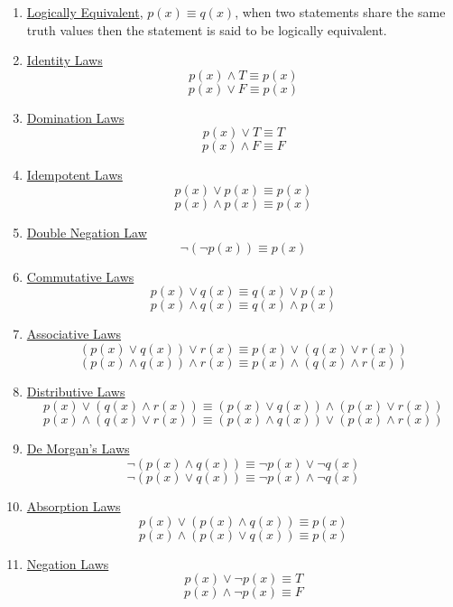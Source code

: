 \documentclass[12pt]{article}
\begin{document}
\begin{enumerate}
\item \underline{Logically Equivalent}, $p(x) \equiv q(x)$, when two statements share the same truth values then the statement is said to be logically equivalent.
\item \underline{Identity Laws} 
\[
	p(x) \wedge T \equiv p(x)
\]
\[
	p(x) \lor F \equiv p(x)
\]

\item \underline{Domination Laws}
\[
	p(x) \lor T \equiv T 
\]
\[
	p(x) \wedge F \equiv F
\]

\item \underline{Idempotent Laws}
\[
	p(x) \lor p(x) \equiv p(x)
\]
\[
	p(x) \wedge p(x) \equiv p(x)
\]

\item \underline{Double Negation Law}
\[
	\neg (\neg p(x)) \equiv p(x)
\]

\item \underline{Commutative Laws}
\[
	p(x) \lor q(x) \equiv q(x) \lor p(x) 
\]
\[
	p(x) \wedge q(x) \equiv q(x) \wedge p(x)
\]

\item \underline{Associative Laws}
\[
	\left ( p(x) \lor q(x) \right ) \lor r(x) \equiv  p(x) \lor \left ( q(x)  \lor r(x) \right )
\]
\[
	\left ( p(x) \wedge q(x) \right ) \wedge r(x) \equiv  p(x) \wedge \left ( q(x)  \wedge r(x) \right )
\]

\item \underline{Distributive Laws}
\[
	p(x) \lor \left ( q(x)  \wedge r(x) \right ) \equiv \left ( p(x) \lor q(x) \right ) \wedge \left ( p(x) \lor r(x) \right )
\]
\[
	p(x) \wedge \left ( q(x)  \lor r(x) \right ) \equiv \left ( p(x) \wedge q(x) \right ) \lor \left ( p(x) \wedge r(x) \right )
\]

\item \underline{De Morgan's Laws}
\[
	\neg \left ( p(x) \wedge q(x) \right ) \equiv \neg p(x) \lor \neg q(x)
\]
\[
	\neg \left ( p(x) \lor q(x) \right ) \equiv \neg p(x) \wedge \neg q(x)
\]

\item \underline{Absorption Laws}
\[
	p(x) \lor \left ( p(x) \wedge q(x) \right ) \equiv p(x)
\]
\[
	p(x) \wedge \left ( p(x) \lor q(x) \right ) \equiv p(x)
\]

\item \underline{Negation Laws}
\[
	p(x) \lor \neg p(x) \equiv T
\]
\[
	p(x) \wedge \neg p(x) \equiv F
\]

\end{enumerate}
\end{document}
